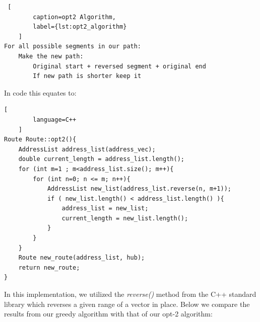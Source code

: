 \documentclass[letterpaper]{article}
\begin{document}
    \begin{lstlisting} [
        caption=opt2 Algorithm,
        label={lst:opt2_algorithm}
    ]
For all possible segments in our path:
    Make the new path:
        Original start + reversed segment + original end 
        If new path is shorter keep it\end{lstlisting}

        In code this equates to: 
    \begin{lstlisting}[
        language=C++
    ]
Route Route::opt2(){
    AddressList address_list(address_vec);
    double current_length = address_list.length();
    for (int m=1 ; m<address_list.size(); m++){
        for (int n=0; n <= m; n++){
            AddressList new_list(address_list.reverse(n, m+1));
            if ( new_list.length() < address_list.length() ){        
                address_list = new_list;
                current_length = new_list.length();
            } 
        }
    }
    Route new_route(address_list, hub);
    return new_route;
}
\end{lstlisting}

    In this implementation, we utilized the \emph{reverse()} method 
    from the C++ standard library which reverses a given range of a vector 
    in place. Below we compare the results from our greedy algorithm 
    with that of our opt-2 algorithm:
\end{document}
